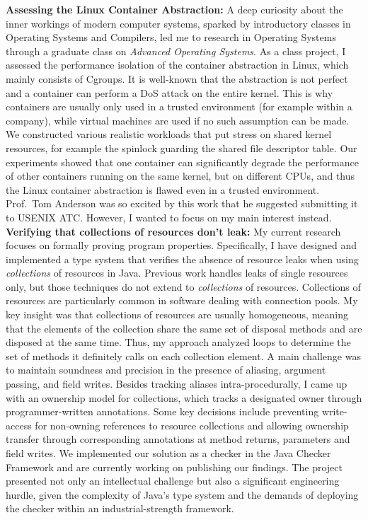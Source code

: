\documentclass{article}
\begin{document}
\textbf{Assessing the Linux Container Abstraction:}
A deep curiosity about the inner workings of modern
computer systems, sparked by introductory classes in Operating Systems and Compilers, led me to research in Operating Systems through a graduate class on \emph{Advanced Operating Systems}. As a class project, I assessed the performance isolation of the container abstraction in Linux, which mainly consists of Cgroups. It is well-known that the abstraction is not perfect and a container can perform a DoS attack on the entire kernel. This is why containers are usually only used in a trusted environment (for example within a company), while virtual machines are used if no such assumption can be made. We constructed various realistic workloads that put stress on shared kernel resources, for example the spinlock guarding the shared file descriptor table. Our experiments showed that one container can significantly degrade the performance of other containers running on the same kernel, but on different CPUs, and thus the Linux container abstraction is flawed even in a trusted environment.
Prof.\ Tom Anderson was so excited by this work that he suggested submitting it to USENIX ATC. However, I wanted to focus on my main interest instead.\\

\textbf{Verifying that collections of resources don't leak:} My current research focuses on formally proving program properties. Specifically, I have designed and implemented a type system that verifies the absence of resource leaks when using \emph{collections} of resources in Java.
Previous work handles leaks of single resources only, but those techniques do not extend to \emph{collections} of resources. Collections of resources are particularly common in software dealing with connection pools.
My key insight was that collections of resources are usually homogeneous, meaning that the elements of the collection share the same set of disposal methods and are disposed at the same time. Thus, my approach analyzed loops to determine the set of methods it definitely calls on each collection element.
A main challenge was to maintain soundness and precision in the presence of aliasing, argument passing, and field writes. Besides tracking aliases intra-procedurally, I came up with an ownership model for collections, which tracks a designated owner through programmer-written annotations. Some key decisions include preventing write-access for non-owning references to resource collections and allowing ownership transfer through corresponding annotations at method returns, parameters and field writes.
We implemented our solution as a checker in the Java Checker Framework and are currently working on publishing our findings. The project presented not only an intellectual challenge but also a significant engineering hurdle, given the complexity of Java's type system and the demands of deploying the checker within an industrial-strength framework.\\
\end{document}
